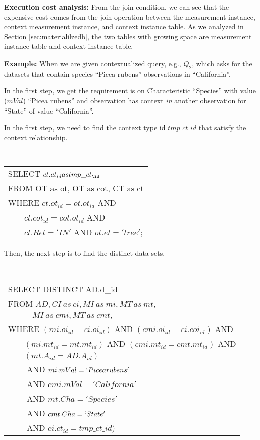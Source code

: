 \documentclass[conference]{IEEEtran}
\begin{document}
{\bf Execution cost analysis:} From the join condition, we can see that the expensive cost comes from
the join operation between the measurement instance, context
measurement instance, and context instance table. 
As we analyzed in Section \ref{sec:materialilzedb}, the two tables with
growing space are measurement instance table and context instance
table. 
 
{\bf Example:} When we are given contextualized query, e.g., $Q_2$, which asks for
the datasets that contain species ``Picea rubens'' observations in
``California''. 

In the first step, we get the requirement is on Characteristic
``Species'' with value ($mVal$) ``Picea rubens'' and observation has context {\em in}
another observation for ``State'' of value ``California''. 



In the first step, we need to find the context type id $tmp\_ct\_id$
that satisfy the context relationship. 

{\tt 
\begin{tabular}{l}
SELECT $ct.ct_{id} as tmp\_ct_\id$\\
FROM OT as ot, OT as cot, CT as ct\\
WHERE $ct.ot_{id} = ot.ot_{id}$ AND \\
      $\qquad ct.cot_{id}= cot.ot_{id}$ AND \\
      $\qquad ct.Rel='IN'$ AND $ot.et='tree'$;
\end{tabular}
}

Then, the next step is to find the distinct data sets. 

\vspace{0.1in}
{\tt 
\begin{tabular}{l}
SELECT DISTINCT AD.d_{id}\\
FROM $AD, CI~as~ci, MI~as~mi, MT~as~mt,$ \\
$\quad\qquad MI~as~cmi, MT~as~cmt,$ \\
WHERE $(mi.oi_{id}=ci.oi_{id})$ AND $(cmi.oi_{id}=ci.coi_{id})$ AND\\
$\qquad (mi.mt_{id}=mt.mt_{id})$ AND $(cmi.mt_{id}=cmt.mt_{id})$ AND\\
$\qquad (mt.A_{id}=AD.A_{id})$\\
$\qquad$ AND $mi.mVal=`Picea rubens'$ \\
$\qquad$ AND $cmi.mVal='California'$\\
$\qquad$ AND $mt.Cha = 'Species'$\\
$\qquad$ AND $cmt.Cha=`State'$\\
$\qquad$ AND $ci.ct_{id} = tmp\_ct\_id)$\\
\end{tabular}
}
\vspace{0.1in}
\end{document}
